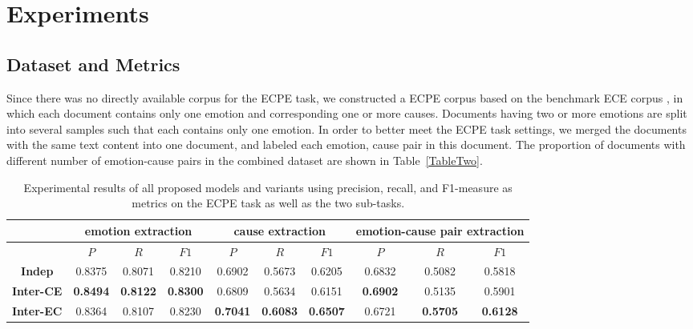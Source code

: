 \documentclass[11pt,a4paper]{article}
\begin{document}
\section{Experiments}

\subsection{Dataset and Metrics}
Since there was no directly available corpus for the ECPE task, we constructed a ECPE corpus based on the benchmark ECE corpus  \cite{gui2016event}, in which each document contains only one emotion and corresponding one or more causes. Documents having two or more emotions are split into several samples such that each contains only one emotion. In order to better meet the ECPE task settings, we merged the documents with the same text content into one document, and labeled each {emotion, cause} pair in this document. The proportion of documents with different number of emotion-cause pairs in the combined dataset are shown in Table~\ref{TableTwo}.



\begin{table*}
	\small
	\centering
	
	\begin{tabular} {c|c|c|c|c|c|c|c|c|c}
		\hline
		  & \multicolumn{3}{|c}{emotion extraction} & \multicolumn{3}{|c}{cause extraction} & \multicolumn{3}{|c}{emotion-cause pair extraction}\\
		\hline
		& $P$ & $R$ & $F1$ & $P$ & $R$ & $F1$ & $P$ & $R$ & $F1$ \\
		\hline
		\textbf{Indep} & 0.8375 & 0.8071 & 0.8210 & 0.6902 & 0.5673 & 0.6205 & 0.6832 & 0.5082 & 0.5818 \\
		\textbf{Inter-CE} & \textbf{0.8494} & \textbf{0.8122} & \textbf{0.8300} & 0.6809 & 0.5634 & 0.6151 & \textbf{0.6902} & 0.5135 & 0.5901\\
		\textbf{Inter-EC} & 0.8364 & 0.8107 & 0.8230 & \textbf{0.7041} & \textbf{0.6083} & \textbf{0.6507} & 0.6721 & \textbf{0.5705} & \textbf{0.6128}\\
		
		\hline
	\end{tabular}
	\caption{Experimental results of all proposed models and variants using precision, recall, and F1-measure as metrics on the ECPE task as well as the two sub-tasks.}
	\label{TableThree}
\end{table*}
\end{document}
